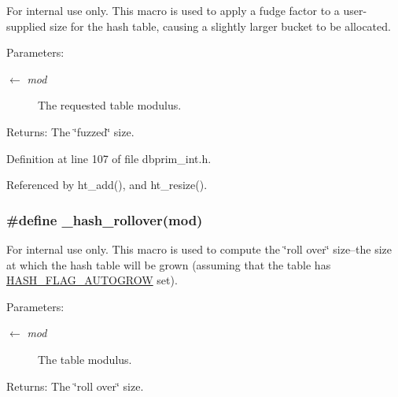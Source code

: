 \begin{Desc}
\item[For internal use only.]
This macro is used to apply a fudge factor to a user-supplied size for the hash table, causing a slightly larger bucket to be allocated.

\begin{Desc}
\item[Parameters:]
\begin{description}
\item[\mbox{$\leftarrow$} {\em mod}]The requested table modulus.\end{description}
\end{Desc}
\begin{Desc}
\item[Returns:]The \char`\"{}fuzzed\char`\"{} size.\end{Desc}
\end{Desc}


Definition at line 107 of file dbprim\_\-int.h.

Referenced by ht\_\-add(), and ht\_\-resize().\hypertarget{group__dbprim__hash_ga46}{
\subsubsection[\_\-hash\_\-rollover]{\setlength{\rightskip}{0pt plus 5cm}\#define \_\-hash\_\-rollover(mod)}}
\label{group__dbprim__hash_ga46}


\begin{Desc}
\item[For internal use only.]
This macro is used to compute the \char`\"{}roll over\char`\"{} size--the size at which the hash table will be grown (assuming that the table has \hyperlink{group__dbprim__hash_ga22}{HASH\_\-FLAG\_\-AUTOGROW} set).

\begin{Desc}
\item[Parameters:]
\begin{description}
\item[\mbox{$\leftarrow$} {\em mod}]The table modulus.\end{description}
\end{Desc}
\begin{Desc}
\item[Returns:]The \char`\"{}roll over\char`\"{} size.\end{Desc}
\end{Desc}


